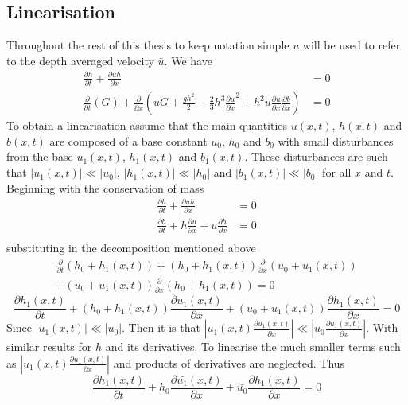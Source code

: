 \documentclass[12pt]{article}
\begin{document}
\subsection{Linearisation} \label{seclinearise}
Throughout the rest of this thesis to keep notation simple $u$ will be used to refer to the depth averaged velocity $\bar{u}$. We have
%
\begin{align*}
\frac{\partial h}{\partial t} + \frac{\partial u h}{\partial x}  &= 0\\
\frac{\partial}{\partial t} \left( G \right)  + \frac{\partial}{\partial x} \left( u G + \frac{gh^2}{2} - \frac{2}{3}h^3 \frac{\partial u}{\partial x}^2 + h^2 u\frac{\partial u}{\partial x}\frac{\partial b}{\partial x} \right) &= 0
\end{align*}
%
To obtain a linearisation assume that the main quantities ${u}(x,t)$, $h(x,t)$ and $b(x,t)$ are composed of a base constant $u_0$, $h_0$ and $b_0$ with small disturbances from the base ${u_1}(x,t)$, $h_1(x,t)$ and $b_1(x,t)$. These disturbances are such that $ |{u_1}(x,t)| \ll |u_0|$, $|h_1(x,t)| \ll |h_0|$ and $|b_1(x,t)| \ll |b_0|$ for all $x$ and $t$. Beginning with the conservation of mass
%
\begin{align*}
\frac{\partial h}{\partial t} + \frac{\partial {u} h}{\partial x}  &= 0\\
\frac{\partial h}{\partial t} + h\frac{\partial {u}}{\partial x} +  {u}\frac{\partial h}{\partial x} &= 0\\
\end{align*}
%
substituting in the decomposition mentioned above
%
\begin{multline*}
\frac{\partial}{\partial t} \left(h_0 + h_1(x,t)\right) + \left(h_0 + h_1(x,t)\right)\frac{\partial}{\partial x} \left( {u_0} + {u_1}(x,t)\right) \\ + \left( {u_0} + {u_1}(x,t)\right)\frac{\partial }{\partial x}\left(h_0 + h_1(x,t)\right) = 0
\end{multline*}
\[\frac{\partial h_1(x,t)}{\partial t} + \left(h_0 + h_1(x,t)\right)\frac{\partial  {u_1}(x,t)}{\partial x} + \left({u_0} + {u_1}(x,t)\right)\frac{\partial h_1(x,t)}{\partial x} = 0\]
%
Since $ |{u_1}(x,t)| \ll |u_0|$. Then it is that
$\left|{u_1}(x,t) \frac{\partial u_1(x,t)}{\partial x} \right| \ll \left|{u_0} \frac{\partial u_1(x,t)}{\partial x} \right|$. With similar results for $h$ and its derivatives. To linearise the much smaller terms such as $|{u_1}(x,t) \frac{\partial u_1(x,t)}{\partial x}|$ and products of derivatives are neglected. Thus
\begin{equation}
\label{eqnSerrelinearmass}
\frac{\partial h_1(x,t)}{\partial t} + h_0\frac{\partial \bar{u_1}(x,t)}{\partial x} + \bar{u_0}\frac{\partial h_1(x,t)}{\partial x} = 0
\end{equation}
\end{document}
